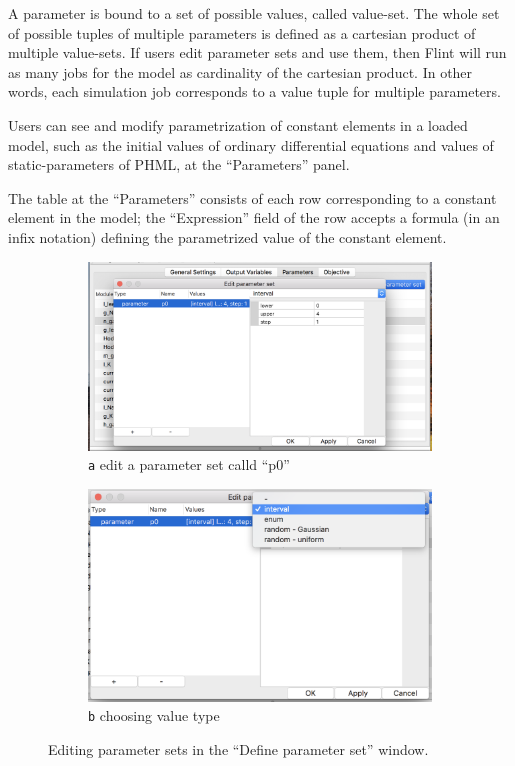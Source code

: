 \documentclass[a4paper,10pt]{report}
\begin{document}
A parameter is bound to a set of possible values, called value-set.
The whole set of possible tuples of multiple parameters is defined as a
cartesian product of multiple value-sets.
If users edit parameter sets and use them, then Flint will run as many jobs
for the model as cardinality of the cartesian product. In other words,
each simulation job corresponds to a value tuple for multiple parameters.

Users can see and modify parametrization of constant elements in a loaded model,
such as the initial values of ordinary differential equations and values of
static-parameters of PHML, at the ``Parameters'' panel.

The table at the ``Parameters'' consists of each row corresponding to a constant
element in the model; the ``Expression'' field of the row accepts a formula
(in an infix notation) defining the parametrized value of the constant element.

\begin{figure}[h]
  \centering
  \begin{subfigure}[b]{0.45\textwidth}
    \includegraphics[width=\textwidth]{lr-edit-parameter-set-a}
    \caption{{\tt a} edit a parameter set calld ``p0''}\label{fig:lr-edit-parameter-set-a}
  \end{subfigure}
  \begin{subfigure}[b]{0.45\textwidth}
    \includegraphics[width=\textwidth]{lr-edit-parameter-set-b}
    \caption{{\tt b} choosing value type}\label{fig:lr-edit-parameter-set-b}
  \end{subfigure}
  \caption{Editing parameter sets in the ``Define parameter set'' window.}
\end{figure}
\end{document}
